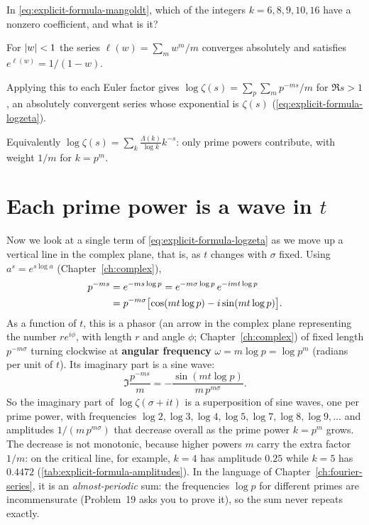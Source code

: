 \begin{checkpoint}
In \cref{eq:explicit-formula-mangoldt}, which of the integers $k=6,8,9,10,16$ have a nonzero coefficient, and what is it?
\end{checkpoint}

\begin{keyideas}
\item For $\left\lvert w\right\rvert<1$ the series $\ell(w)=\sum_m w^m/m$ converges absolutely and satisfies $e^{\ell(w)}=1/(1-w)$.
\item Applying this to each Euler factor gives $\log\zeta(s)=\sum_p\sum_m p^{-ms}/m$ for $\Re s>1$, an absolutely convergent series whose exponential is $\zeta(s)$ (\cref{eq:explicit-formula-logzeta}).
\item Equivalently $\log\zeta(s)=\sum_k \frac{\Lambda(k)}{\log k}k^{-s}$: only prime powers contribute, with weight $1/m$ for $k=p^m$.
\end{keyideas}

\section{Each prime power is a wave in $t$}\label{sec:explicit-formula-waves}

Now we look at a single term of \cref{eq:explicit-formula-logzeta} as we move up a vertical line in the complex plane, that is, as $t$ changes with $\sigma$ fixed. Using $a^{s}=e^{s\log a}$ (Chapter~\ref{ch:complex}),
\begin{align}
p^{-ms}&=e^{-ms\log p}=e^{-m\sigma\log p}\,e^{-imt\log p}\notag\\
&=p^{-m\sigma}\bigl[\cos(mt\log p)-i\sin(mt\log p)\bigr].\label{eq:explicit-formula-phasor}
\end{align}
As a function of $t$, this is a phasor (an arrow in the complex plane representing the number $re^{i\phi}$, with length $r$ and angle $\phi$; Chapter~\ref{ch:complex}) of fixed length $p^{-m\sigma}$ turning clockwise at \textbf{angular frequency} $\omega=m\log p=\log p^m$ (radians per unit of $t$). Its imaginary part is a sine wave:
\begin{equation}
\Im\frac{p^{-ms}}{m}=-\frac{\sin(mt\log p)}{m\,p^{m\sigma}} .
\label{eq:explicit-formula-imterm}
\end{equation}
So the imaginary part of $\log\zeta(\sigma+it)$ is a superposition of sine waves, one per prime power, with frequencies $\log 2,\log3,\log4,\log5,\log7,\log8,\log9,\dots$ and amplitudes $1/(m\,p^{m\sigma})$ that decrease overall as the prime power $k=p^m$ grows. The decrease is not monotonic, because higher powers $m$ carry the extra factor $1/m$: on the critical line, for example, $k=4$ has amplitude $0.25$ while $k=5$ has $0.4472$ (\cref{tab:explicit-formula-amplitudes}). In the language of Chapter~\ref{ch:fourier-series}, it is an \emph{almost-periodic} sum: the frequencies $\log p$ for different primes are incommensurate (Problem~19 asks you to prove it), so the sum never repeats exactly.

